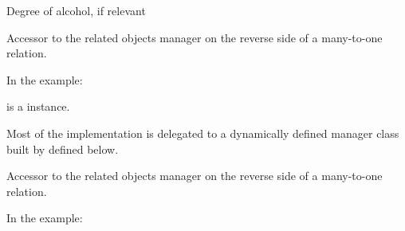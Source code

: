 \documentclass[letterpaper,10pt,english]{sphinxmanual}
\begin{document}
\begin{fulllineitems}

\begin{fulllineitems}
\label{\detokenize{modules/models:gestion.models.Product.deg}}
Degree of alcohol, if relevant

\end{fulllineitems}


\begin{fulllineitems}
\label{\detokenize{modules/models:gestion.models.Product.futd}}
Accessor to the related objects manager on the reverse side of a
many-to-one relation.

In the example:

\begin{sphinxVerbatim}[commandchars=\\\{\}]
 
       
\end{sphinxVerbatim}

 is a  instance.

Most of the implementation is delegated to a dynamically defined manager
class built by  defined below.

\end{fulllineitems}


\begin{fulllineitems}
\label{\detokenize{modules/models:gestion.models.Product.futg}}
Accessor to the related objects manager on the reverse side of a
many-to-one relation.

In the example:

\begin{sphinxVerbatim}[commandchars=\\\{\}]
 
       
\end{sphinxVerbatim}


\end{fulllineitems}
\end{fulllineitems}
\end{document}
